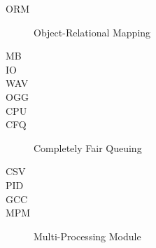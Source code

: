 \begin{description}
  \item[ORM] Object-Relational Mapping %
  \item[MB] %
  \item[IO] %
  \item[WAV] %
  \item[OGG] %
  \item[CPU] %
  \item[CFQ] Completely Fair Queuing %
  \item[CSV] %
  \item[PID] %
  \item[GCC] %
  \item[MPM] Multi-Processing Module %
\end{description}



